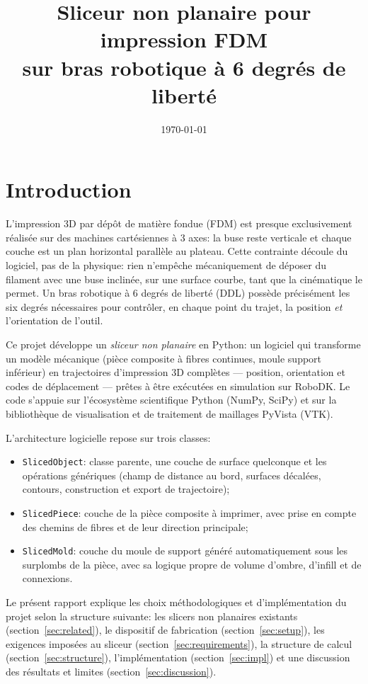 \documentclass[11pt,a4paper]{article}
\title{Sliceur non planaire pour impression FDM\\sur bras robotique à 6 degrés de liberté}
\author{}
\date{\today}
\begin{document}
\maketitle
\tableofcontents

\section{Introduction}

L'impression 3D par dépôt de matière fondue (FDM) est presque
exclusivement réalisée sur des machines cartésiennes à 3 axes: la
buse reste verticale et chaque couche est un plan horizontal parallèle
au plateau. Cette contrainte découle du logiciel, pas de la physique:
rien n'empêche mécaniquement de déposer du filament avec une buse
inclinée, sur une surface courbe, tant que la cinématique le permet.
Un bras robotique à 6 degrés de liberté (DDL) possède précisément les
six degrés nécessaires pour contrôler, en chaque point du trajet, la
position \emph{et} l'orientation de l'outil.

Ce projet développe un \emph{sliceur non planaire} en Python: un
logiciel qui transforme un modèle mécanique (pièce composite à fibres
continues, moule support inférieur) en trajectoires d'impression 3D
complètes --- position, orientation et codes de déplacement --- prêtes
à être exécutées en simulation sur RoboDK. Le code s'appuie sur
l'écosystème scientifique Python (NumPy, SciPy) et sur la bibliothèque
de visualisation et de traitement de maillages PyVista (VTK).

L'architecture logicielle repose sur trois classes:
\begin{itemize}
  \item \texttt{SlicedObject}: classe parente, une couche de surface
        quelconque et les opérations génériques (champ de distance au
        bord, surfaces décalées, contours, construction et export de
        trajectoire);
  \item \texttt{SlicedPiece}: couche de la pièce composite à imprimer,
        avec prise en compte des chemins de fibres et de leur direction
        principale;
  \item \texttt{SlicedMold}: couche du moule de support généré
        automatiquement sous les surplombs de la pièce, avec sa
        logique propre de volume d'ombre, d'infill et de connexions.
\end{itemize}
Le présent rapport explique les choix méthodologiques et
d'implémentation du projet selon la structure suivante: les slicers non
planaires existants (section~\ref{sec:related}), le dispositif de
fabrication (section~\ref{sec:setup}), les exigences imposées au sliceur
(section~\ref{sec:requirements}), la structure de calcul
(section~\ref{sec:structure}), l'implémentation (section~\ref{sec:impl})
et une discussion des résultats et limites (section~\ref{sec:discussion}).
\end{document}
